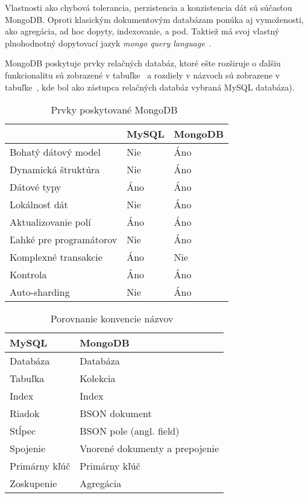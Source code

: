 Vlastnosti ako chybová tolerancia, perzistencia a konzistencia dát sú súčasťou MongoDB. Oproti klasickým dokumentovým databázam ponúka aj vymoženosti, ako agregácia, ad hoc dopyty, indexovanie, a pod. Taktiež má svoj vlastný plnohodnotný dopytovací jazyk \textit{mongo query language}~\cite{NoSQLDBvsRealtionDB}.

MongoDB poskytuje prvky relačných databáz, ktoré ešte rozširuje o ďalšiu funkcionalitu sú zobrazené v tabuľke~ a rozdiely v názvoch sú zobrazene v tabuľke~, kde bol ako zástupca relačných databáz vybraná MySQL databáza).

\begin{table}[]
	\centering
	\caption{Prvky poskytované MongoDB~\cite{MongoDBvsMySQLCompared}}
	\label{table:features_of_mongodb}
	\begin{tabular}{|l|l|l|}
	\hline
		& \textbf{MySQL} & \textbf{MongoDB} \\ \hline
		Bohatý dátový model & Nie & Áno \\ \hline
		Dynamická štruktúra & Nie & Áno \\ \hline
		Dátové typy & Áno & Áno \\ \hline
		Lokálnosť dát & Nie & Áno \\ \hline
		Aktualizovanie polí & Áno & Áno \\ \hline
		Ľahké pre programátorov & Nie & Áno \\ \hline
		Komplexné transakcie & Áno & Nie \\ \hline
		Kontrola & Áno & Áno \\ \hline
		Auto-sharding & Nie & Áno \\ \hline
	\end{tabular}
\end{table}

\begin{table}[]
	\centering
	\caption{Porovnanie konvencie názvov~\cite{MongoDBvsMySQL2015}}
	\label{table:names_of_mongodb}
	\begin{tabular}{|l|l|}
	\hline
		\textbf{MySQL} & \textbf{MongoDB} \\ \hline
		Databáza & Databáza \\ \hline
		Tabuľka & Kolekcia \\ \hline
		Index & Index \\ \hline
		Riadok & BSON dokument \\ \hline
		Stĺpec & BSON pole (angl. field) \\ \hline
		Spojenie & Vnorené dokumenty a prepojenie \\ \hline
		Primárny kľúč & Primárny kľúč \\ \hline
		Zoskupenie & Agregácia \\ \hline
	\end{tabular}
\end{table}
